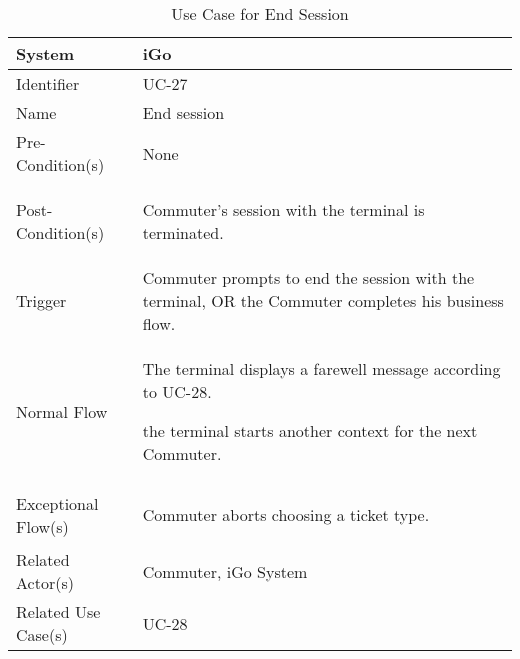\begin{table}[ht]
    \centering
    \begin{tabular}{|l|p{11cm}|}
        \hline
        System             & iGo\\
        \hline
        Identifier         & UC-27 \\
        \hline
        Name               & End session \\
        \hline
        Pre-Condition(s)   & None\\
        \hline
        Post-Condition(s)  & 
        \begin{enumerate*}[itemjoin=\newline]
            \item Commuter's session with the terminal is terminated.
        \end{enumerate*} \\
        \hline
        Trigger            & Commuter prompts to end the session with the terminal, OR the Commuter completes his business flow. \\
        \hline
        Normal Flow        & 
        \begin{enumerate*}[itemjoin=\newline]
            \item The terminal displays a farewell message according to UC-28.
            \item the terminal starts another context for the next Commuter.
        \end{enumerate*} \\
        \hline
        Exceptional Flow(s)& 
        \begin{enumerate*}[itemjoin=\newline]
            \item Commuter aborts choosing a ticket type.
        \end{enumerate*} \\
        \hline
        Related Actor(s)   & Commuter, iGo System \\
        \hline
        Related Use Case(s)& UC-28\\
        \hline
    \end{tabular}
    \caption{Use Case for End Session}
    \label{tab:UC_EndSession}
\end{table}
\clearpage

